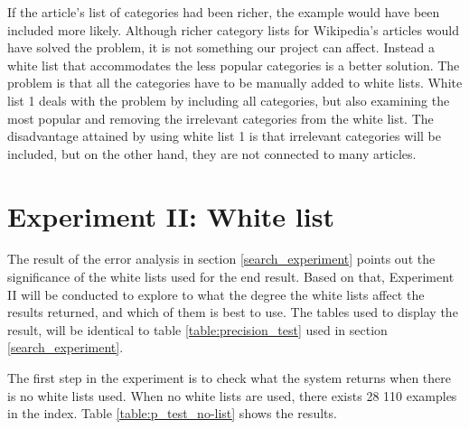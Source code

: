 If the article's list of categories had been richer, the example would have been included more likely. Although richer category lists for Wikipedia's articles would have solved the problem, it is not something our project can affect. Instead a white list that accommodates the less popular categories is a better solution. The problem is that all the categories have to be manually added to white lists. White list 1 deals with the problem by including all categories, but also examining the most popular and removing the irrelevant categories from the white list. The disadvantage attained by using white list 1 is that irrelevant categories will be included, but on the other hand, they are not connected to many articles. 

\section{Experiment II: White list}

The result of the error analysis in section \ref{search_experiment} points out the significance of the white lists used for the end result. Based on that, Experiment II will be conducted to explore to what the degree the white lists affect the results returned, and which of them is best to use. The tables used to display the result, will be identical to table \ref{table:precision_test} used in section \ref{search_experiment}. 

The first step in the experiment is to check what the system returns when there is no white lists used. When no white lists are used, there exists 28 110 examples in the index. Table \ref{table:p_test_no-list} shows the results.

